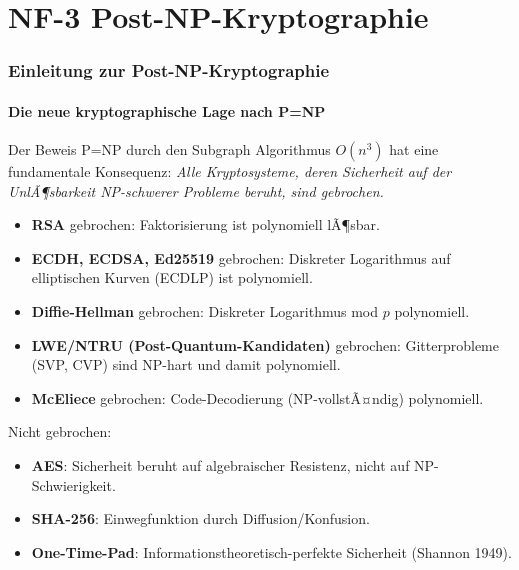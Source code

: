 ﻿\documentclass[a4paper,12pt]{scrreprt}
\theoremstyle{definition}
\begin{document}
\part{NF-3 \quad Post-NP-Kryptographie}
\label{part:nf3}

\section{Einleitung zur Post-NP-Kryptographie}

\subsection{Die neue kryptographische Lage nach P=NP}

Der Beweis P=NP durch den Subgraph Algorithmus $O(n^3)$ hat eine
fundamentale Konsequenz: \emph{Alle Kryptosysteme, deren Sicherheit auf
der UnlÃ¶sbarkeit NP-schwerer Probleme beruht, sind gebrochen.}

\begin{itemize}
  \item \textbf{RSA} gebrochen: Faktorisierung ist polynomiell lÃ¶sbar.
  \item \textbf{ECDH, ECDSA, Ed25519} gebrochen: Diskreter Logarithmus
    auf elliptischen Kurven (ECDLP) ist polynomiell.
  \item \textbf{Diffie-Hellman} gebrochen: Diskreter Logarithmus mod $p$
    polynomiell.
  \item \textbf{LWE/NTRU (Post-Quantum-Kandidaten)} gebrochen:
    Gitterprobleme (SVP, CVP) sind NP-hart und damit polynomiell.
  \item \textbf{McEliece} gebrochen: Code-Decodierung (NP-vollstÃ¤ndig)
    polynomiell.
\end{itemize}

Nicht gebrochen:
\begin{itemize}
  \item \textbf{AES}: Sicherheit beruht auf algebraischer Resistenz, nicht
    auf NP-Schwierigkeit.
  \item \textbf{SHA-256}: Einwegfunktion durch Diffusion/Konfusion.
  \item \textbf{One-Time-Pad}: Informationstheoretisch-perfekte Sicherheit
    (Shannon 1949).
\end{itemize}
\end{document}
